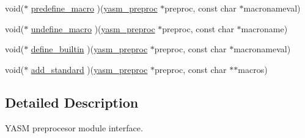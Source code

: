 \begin{DoxyCompactItemize}
void($\ast$ \hyperlink{structyasm__preproc__module_a5fee10336340a7523a4397fd1226ce24}{predefine\-\_\-macro} )(\hyperlink{coretype_8h_aa84094d121bb4afca049e6c35efc2c92}{yasm\-\_\-preproc} $\ast$preproc, const char $\ast$macronameval)
\item 
void($\ast$ \hyperlink{structyasm__preproc__module_ab046fe71ecaa89b656337afca1183da9}{undefine\-\_\-macro} )(\hyperlink{coretype_8h_aa84094d121bb4afca049e6c35efc2c92}{yasm\-\_\-preproc} $\ast$preproc, const char $\ast$macroname)
\item 
void($\ast$ \hyperlink{structyasm__preproc__module_a8a9362273dc38d88a213641d1e45b0ed}{define\-\_\-builtin} )(\hyperlink{coretype_8h_aa84094d121bb4afca049e6c35efc2c92}{yasm\-\_\-preproc} $\ast$preproc, const char $\ast$macronameval)
\item 
void($\ast$ \hyperlink{structyasm__preproc__module_a30b205d2b32e4b74f0200658455a00eb}{add\-\_\-standard} )(\hyperlink{coretype_8h_aa84094d121bb4afca049e6c35efc2c92}{yasm\-\_\-preproc} $\ast$preproc, const char $\ast$$\ast$macros)
\end{DoxyCompactItemize}


\subsection{Detailed Description}
Y\-A\-S\-M preprocesor module interface. 

